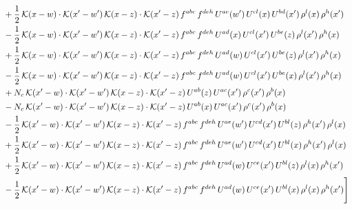 \documentclass[9pt]{article}
\numberwithin{equation}{section}
\begin{document}
\begin{align}
& +\frac{1}{2}\,\mathcal{K}(x-w)\cdot\mathcal{K}(x'-w')\,\mathcal{K}(x-z)\cdot\mathcal{K}(x'-z)\,f^{abc}\,f^{deh}\,U^{ae}(w')\,U^{cl}(x)\,U^{bd}(x')\,\rho^{l}(x)\,\rho^{h}(x')\notag\\
& -\frac{1}{2}\,\mathcal{K}(x-w)\cdot\mathcal{K}(x'-w')\,\mathcal{K}(x-z)\cdot\mathcal{K}(x'-z)\,f^{abc}\,f^{deh}\,U^{ad}(x)\,U^{cl}(x')\,U^{be}(z)\,\rho^{l}(x')\,\rho^{h}(x)\notag\\
& +\frac{1}{2}\,\mathcal{K}(x-w)\cdot\mathcal{K}(x'-w')\,\mathcal{K}(x-z)\cdot\mathcal{K}(x'-z)\,f^{abc}\,f^{deh}\,U^{ad}(w)\,U^{cl}(x')\,U^{be}(z)\,\rho^{l}(x')\,\rho^{h}(x)\notag\\
& -\frac{1}{2}\,\mathcal{K}(x-w)\cdot\mathcal{K}(x'-w')\,\mathcal{K}(x-z)\cdot\mathcal{K}(x'-z)\,f^{abc}\,f^{deh}\,U^{ad}(w)\,U^{cl}(x')\,U^{be}(x)\,\rho^{l}(x')\,\rho^{h}(x)\notag\\
& +N_{c}\,\mathcal{K}(x'-w)\cdot\mathcal{K}(x'-w')\,\mathcal{K}(x-z)\cdot\mathcal{K}(x'-z)\,U^{ab}(z)\,U^{ac}(x')\,\rho^{c}(x')\,\rho^{b}(x)\notag\\
& -N_{c}\,\mathcal{K}(x'-w)\cdot\mathcal{K}(x'-w')\,\mathcal{K}(x-z)\cdot\mathcal{K}(x'-z)\,U^{ab}(x)\,U^{ac}(x')\,\rho^{c}(x')\,\rho^{b}(x)\notag\\
& -\frac{1}{2}\,\mathcal{K}(x'-w)\cdot\mathcal{K}(x'-w')\,\mathcal{K}(x-z)\cdot\mathcal{K}(x'-z)\,f^{abc}\,f^{deh}\,U^{ae}(w')\,U^{cd}(x')\,U^{bl}(z)\,\rho^{h}(x')\,\rho^{l}(x)\notag\\
& +\frac{1}{2}\,\mathcal{K}(x'-w)\cdot\mathcal{K}(x'-w')\,\mathcal{K}(x-z)\cdot\mathcal{K}(x'-z)\,f^{abc}\,f^{deh}\,U^{ae}(w')\,U^{cd}(x')\,U^{bl}(x)\,\rho^{h}(x')\,\rho^{l}(x)\notag\\
& +\frac{1}{2}\,\mathcal{K}(x'-w)\cdot\mathcal{K}(x'-w')\,\mathcal{K}(x-z)\cdot\mathcal{K}(x'-z)\,f^{abc}\,f^{deh}\,U^{ad}(w)\,U^{ce}(x')\,U^{bl}(z)\,\rho^{l}(x)\,\rho^{h}(x')\notag\\
& -\frac{1}{2}\,\mathcal{K}(x'-w)\cdot\mathcal{K}(x'-w')\,\mathcal{K}(x-z)\cdot\mathcal{K}(x'-z)\,f^{abc}\,f^{deh}\,U^{ad}(w)\,U^{ce}(x')\,U^{bl}(x)\,\rho^{l}(x)\,\rho^{h}(x')\Bigg]
\end{align}
\end{document}
